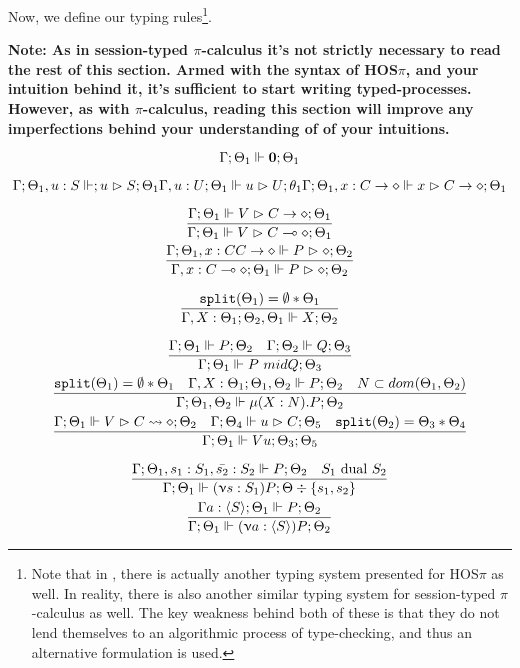 Now, we define our typing rules\footnote{Note that in \cite{main}, there is actually another typing system presented for HOS$\pi$ as well. In reality, there is also another similar typing system for session-typed $\pi$-calculus as well. The key weakness behind both of these is that they do not lend themselves to an algorithmic process of type-checking, and thus an alternative formulation is used.}. 

\textbf{Note: As in session-typed $\pi$-calculus it's not strictly necessary to read the rest of this section. Armed with the syntax of HOS$\pi$, and your intuition behind it, it's sufficient to start writing typed-processes. However, as with $\pi$-calculus, reading this section will improve any imperfections behind your understanding of of your intuitions.}

$$
\Gamma ; \Theta_1 \Vdash \textbf{0} ; \Theta_1
$$

$$
\Gamma ; \Theta_1, u:S \Vdash ; u \vartriangleright S ; \Theta_1
\Gamma, u : U ; \Theta_1 \Vdash u \vartriangleright U ; \theta_1
\Gamma ; \Theta_1 , x : C \rightarrow \diamond \Vdash x \vartriangleright C \rightarrow \diamond ; \Theta_1
$$

\begin{gather*}
\frac{\Gamma ; \Theta_1 \Vdash V \vartriangleright C \rightarrow \diamond ; \Theta_1}{\Gamma ; \Theta_1 \Vdash V \vartriangleright C \multimap \diamond ; \Theta_1} \\
\frac{\Gamma ; \Theta_1, x : C C \rightarrow \diamond \Vdash P \vartriangleright \diamond ; \Theta_2}{\Gamma, x : C \multimap \diamond ; \Theta_1 \Vdash P \vartriangleright \diamond ; \Theta_2}
\end{gather*}

$$
\frac{\texttt{split}(\Theta_1) = \emptyset * \Theta_1}{\Gamma , X : \Theta_1 ; \Theta_2, \Theta_1 \Vdash X ; \Theta_2}
$$

\begin{gather*}
\frac{\Gamma ; \Theta_1 \Vdash P ; \Theta_2 \quad \Gamma ; \Theta_2 \Vdash Q ; \Theta_3}{\Gamma ; \Theta_1 \Vdash P \ mid Q ; \Theta_3} \\
\frac{\texttt{split}(\Theta_1) = \emptyset * \Theta_1 \quad \Gamma , X : \Theta_1 ; \Theta_1, \Theta_2 \Vdash P ; \Theta_2 \quad N \subset dom(\Theta_1, \Theta_2)}{\Gamma ; \Theta_1, \Theta_2 \Vdash \mu(X : N) . P ; \Theta_2} \\
\frac{\Gamma ; \Theta_1 \Vdash V \vartriangleright C \leadsto \diamond ; \Theta_2 \quad \Gamma ; \Theta_4 \Vdash u \vartriangleright C ; \Theta_5 \quad \texttt{split}(\Theta_2) = \Theta_3 * \Theta_4}{\Gamma ; \Theta_1 \Vdash V u ; \Theta_3 ; \Theta_5}
\end{gather*}

\begin{gather*}
\frac{\Gamma ; \Theta_1 , s_1 : S_1, \bar{s_2} : S_2 \Vdash P ; \Theta_2 \quad S_1 \text{ dual } S_2}{\Gamma ; \Theta_1 \Vdash (\upnu s : S_1)P ; \Theta \div \{s_1, s_2\}} \\
\frac{\Gamma a : \langle S \rangle ; \Theta_1 \Vdash P ; \Theta_2}{\Gamma ; \Theta_1 \Vdash (\upnu a : \langle S \rangle)P ; \Theta_2} \\
\end{gather*}

